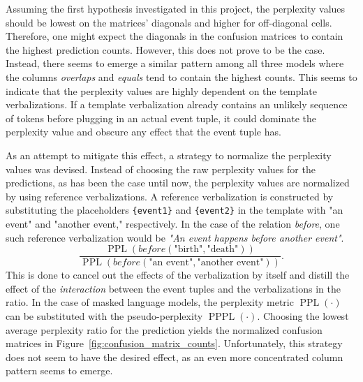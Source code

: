 \documentclass[11pt]{article}
\DeclareMathOperator{\PPL}{PPL}
\DeclareMathOperator{\PPPL}{PPPL}
\begin{document}
Assuming the first hypothesis investigated in this project, the perplexity values should be lowest on the matrices' diagonals and higher for off-diagonal cells. Therefore, one might expect the diagonals in the confusion matrices to contain the highest prediction counts. However, this does not prove to be the case. Instead, there seems to emerge a similar pattern among all three models where the columns \textit{overlaps} and \textit{equals} tend to contain the highest counts. This seems to indicate that the perplexity values are highly dependent on the template verbalizations. If a template verbalization already contains an unlikely sequence of tokens before plugging in an actual event tuple, it could dominate the perplexity value and obscure any effect that the event tuple has.

As an attempt to mitigate this effect, a strategy to normalize the perplexity values was devised. Instead of choosing the raw perplexity values for the predictions, as has been the case until now, the perplexity values are normalized by using reference verbalizations. A reference verbalization is constructed by substituting the placeholders \texttt{\{event1\}} and \texttt{\{event2\}} in the template with "an event" and "another event," respectively. In the case of the relation \textit{before}, one such reference verbalization would be \textit{"An event happens before another event"}.
\begin{equation}
  \frac{\PPL\left(\textit{before}(\text{"birth"}, \text{"death"})\right)}{\PPL\left(\textit{before}(\text{"an event"}, \text{"another event"})\right)}.
\end{equation}
This is done to cancel out the effects of the verbalization by itself and distill the effect of the \emph{interaction} between the event tuples and the verbalizations in the ratio. In the case of masked language models, the perplexity metric $\PPL(\cdot)$ can be substituted with the pseudo-perplexity $\PPPL(\cdot)$. Choosing the lowest average perplexity ratio for the prediction yields the normalized confusion matrices in Figure~\ref{fig:confusion_matrix_counts}. Unfortunately, this strategy does not seem to have the desired effect, as an even more concentrated column pattern seems to emerge.
\end{document}
